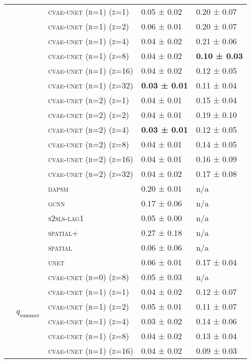 \documentclass{article}
\begin{document}
\begin{table}[!tbp]
\begin{tabular}{lllll}
 &  & \textsc{cvae-unet (r=1) (z=1)} & 0.05 ± { 0.02} & 0.20 ± { 0.07} \\
 &  & \textsc{cvae-unet (r=1) (z=2)} & 0.06 ± { 0.01} & 0.20 ± { 0.07} \\
 &  & \textsc{cvae-unet (r=1) (z=4)} & 0.04 ± { 0.02} & 0.21 ± { 0.06} \\
 &  & \textsc{cvae-unet (r=1) (z=8)} & 0.04 ± { 0.02} & \bf 0.10 ± { 0.03} \\
 &  & \textsc{cvae-unet (r=1) (z=16)} & 0.04 ± { 0.02} & 0.12 ± { 0.05} \\
 &  & \textsc{cvae-unet (r=1) (z=32)} & \bf 0.03 ± { 0.01} & 0.11 ± { 0.04} \\
 &  & \textsc{cvae-unet (r=2) (z=1)} & 0.04 ± { 0.01} & 0.15 ± { 0.04} \\
 &  & \textsc{cvae-unet (r=2) (z=2)} & 0.04 ± { 0.01} & 0.19 ± { 0.10} \\
 &  & \textsc{cvae-unet (r=2) (z=4)} & \bf 0.03 ± { 0.01} & 0.12 ± { 0.05} \\
 &  & \textsc{cvae-unet (r=2) (z=8)} & 0.04 ± { 0.01} & 0.14 ± { 0.05} \\
 &  & \textsc{cvae-unet (r=2) (z=16)} & 0.04 ± { 0.01} & 0.16 ± { 0.09} \\
 &  & \textsc{cvae-unet (r=2) (z=32)} & 0.04 ± { 0.02} & 0.17 ± { 0.08} \\
 &  & \textsc{dapsm} & 0.20 ± { 0.01} & n/a \\
 &  & \textsc{gcnn} & 0.17 ± { 0.06} & n/a \\
 &  & \textsc{s2sls-lag1} & 0.05 ± { 0.00} & n/a \\
 &  & \textsc{spatial+} & 0.27 ± { 0.18} & n/a \\
 &  & \textsc{spatial} & 0.06 ± { 0.06} & n/a \\
 &  & \textsc{unet} & 0.06 ± { 0.01} & 0.17 ± { 0.04} \\
\cline{2-5}
 & \multirow[t]{19}{*}{$q_{\text{summer}}$} & \textsc{cvae-unet (r=0) (z=8)} & 0.05 ± { 0.03} & n/a \\
 &  & \textsc{cvae-unet (r=1) (z=1)} & 0.04 ± { 0.02} & 0.12 ± { 0.07} \\
 &  & \textsc{cvae-unet (r=1) (z=2)} & 0.05 ± { 0.01} & 0.11 ± { 0.07} \\
 &  & \textsc{cvae-unet (r=1) (z=4)} & 0.03 ± { 0.02} & 0.14 ± { 0.06} \\
 &  & \textsc{cvae-unet (r=1) (z=8)} & 0.04 ± { 0.02} & 0.13 ± { 0.04} \\
 &  & \textsc{cvae-unet (r=1) (z=16)} & 0.04 ± { 0.02} & 0.09 ± { 0.03} \\

\end{tabular}
\end{table}
\end{document}
